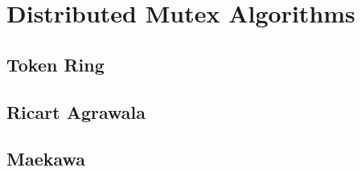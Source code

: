 \chapter{\centering Distributed Mutex Algorithms}

\section{Token Ring}

\section{Ricart Agrawala}

\section{Maekawa}

